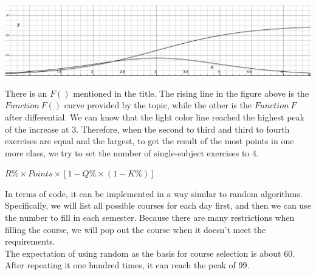 \includegraphics[scale=1.02]{images/F(x)_ext.eps}


There is an $F()$ mentioned in the title. 
The rising line in the figure above is the $Function\ F()$ curve provided by the topic, while the other is the $Function\ F$ after differential. We can know that the light color line reached the highest peak of the increase at 3. Therefore, when the second to third and third to fourth exercises are equal and the largest, to get the result of the most points in one more class, we try to set the number of single-subject exercises to 4. 
~\\


$ R \% \times Points \times [1 - Q\% \times(1 - K\%)] $


In terms of code, it can be implemented in a way similar to random algorithms. Specifically, we will list all possible courses for each day first, and then we can use the number to fill in each semester. Because there are many restrictions when filling the course, we will pop out the course when it doesn't meet the requirements. 
~\\

The expectation of using random as the basis for course selection is about 60. After repeating it one hundred times, it can reach the peak of 99.
~\\

